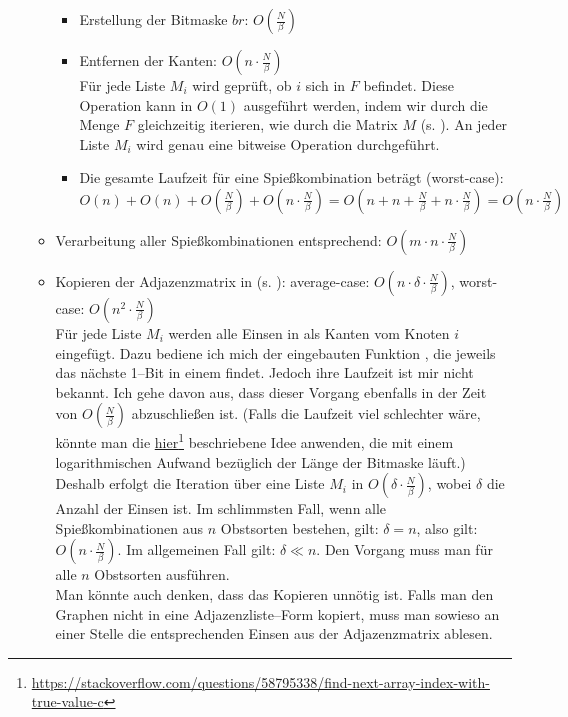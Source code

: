 \begin{itemize}
\begin{itemize}
\begin{itemize}
      \item Erstellung der Bitmaske $br$: $O(\frac{N}{\beta})$

      \item Entfernen der Kanten: $O(n \cdot \frac{N}{\beta})$\\
      Für jede Liste $M_i$ wird geprüft, ob $i$ sich in $F$ befindet.
      Diese Operation kann in $O(1)$ ausgeführt werden, indem wir durch
      die Menge $F$ gleichzeitig iterieren, wie durch die Matrix $M$ (s. ).
      An jeder Liste $M_i$ wird genau eine bitweise Operation durchgeführt.

      \item Die gesamte Laufzeit für eine Spießkombination beträgt (worst-case):\\
      $O(n) + O(n) + O(\frac{N}{\beta}) + O(n \cdot\frac{N}{\beta}) 
      = O(n + n + \frac{N}{\beta} + n \cdot\frac{N}{\beta}) = O(n \cdot\frac{N}{\beta})$
    \end{itemize}

    \item Verarbeitung aller Spießkombinationen entsprechend: $O(m \cdot n \cdot\frac{N}{\beta})$

    \item Kopieren der Adjazenzmatrix in  (s. ): average-case: $O(n \cdot \delta \cdot \frac{N}{\beta})$, worst-case: $O(n^2 \cdot \frac{N}{\beta})$ \\
    Für jede Liste $M_i$ werden alle Einsen in  als Kanten vom Knoten $i$ eingefügt.
    Dazu bediene ich mich der eingebauten Funktion ,
    die jeweils das nächste 1--Bit in einem  findet.
    Jedoch ihre Laufzeit ist mir nicht bekannt.
    Ich gehe davon aus, dass dieser Vorgang ebenfalls in der Zeit von $O(\frac{N}{\beta})$ abzuschließen ist. 
    (Falls die Laufzeit viel schlechter wäre, könnte man die \href{https://stackoverflow.com/questions/58795338/find-next-array-index-with-true-value-c}{hier}\footnote{\href{https://stackoverflow.com/questions/58795338/find-next-array-index-with-true-value-c}{https://stackoverflow.com/questions/58795338/find-next-array-index-with-true-value-c}} beschriebene Idee anwenden,
    die mit einem logarithmischen Aufwand bezüglich der Länge der Bitmaske läuft.)\\
    Deshalb erfolgt die Iteration über eine Liste $M_i$ in $O(\delta \cdot \frac{N}{\beta})$, wobei
    $\delta$ die Anzahl der Einsen ist. Im schlimmsten Fall, wenn alle Spießkombinationen aus
    $n$ Obstsorten bestehen, gilt: $\delta = n$, also gilt: $O(n \cdot \frac{N}{\beta})$.
    Im allgemeinen Fall gilt: $\delta \ll n$. Den Vorgang muss man für alle $n$ Obstsorten
    ausführen.\\
    Man könnte auch denken, dass das Kopieren unnötig ist. Falls man den Graphen nicht
    in eine Adjazenzliste--Form kopiert,
    muss man sowieso an einer Stelle die entsprechenden Einsen aus der Adjazenzmatrix ablesen.


\end{itemize}
\end{itemize}
